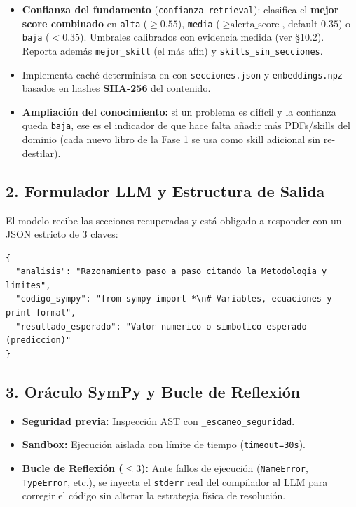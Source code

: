 \documentclass[11pt,a4paper]{article}
\begin{document}
\begin{itemize}[leftmargin=*]
  \item \textbf{Confianza del fundamento} (\texttt{confianza\_retrieval}): clasifica el \textbf{mejor score combinado} en \texttt{alta} ($\ge 0.55$), \texttt{media} ($\ge \text{alerta\_score}$, default $0.35$) o \texttt{baja} ($< 0.35$). Umbrales calibrados con evidencia medida (ver §10.2). Reporta además \texttt{mejor\_skill} (el más afín) y \texttt{skills\_sin\_secciones}.
  \item Implementa caché determinista en  con \texttt{secciones.json} y \texttt{embeddings.npz} basados en hashes \textbf{SHA-256} del contenido.
  \item \textbf{Ampliación del conocimiento:} si un problema es difícil y la confianza queda \texttt{baja}, ese es el indicador de que hace falta añadir más PDFs/skills del dominio (cada nuevo libro de la Fase 1 se usa como skill adicional sin re-destilar).
\end{itemize}

\subsection{2. Formulador LLM y Estructura de Salida}
El modelo recibe las secciones recuperadas y está obligado a responder con un JSON estricto de 3 claves:
\begin{tcolorbox}[cajaContenido, title={\faIcon{code}~Contrato de Datos del Formulador}]
\begin{lstlisting}
{
  "analisis": "Razonamiento paso a paso citando la Metodologia y limites",
  "codigo_sympy": "from sympy import *\n# Variables, ecuaciones y print formal",
  "resultado_esperado": "Valor numerico o simbolico esperado (prediccion)"
}
\end{lstlisting}
\end{tcolorbox}

\subsection{3. Oráculo SymPy y Bucle de Reflexión}
\begin{itemize}[leftmargin=*]
  \item \textbf{Seguridad previa:} Inspección AST con \texttt{\_escaneo\_seguridad}.
  \item \textbf{Sandbox:} Ejecución aislada con límite de tiempo (\texttt{timeout=30s}).
  \item \textbf{Bucle de Reflexión ($\le 3$):} Ante fallos de ejecución (\texttt{NameError}, \texttt{TypeError}, etc.), se inyecta el \texttt{stderr} real del compilador al LLM para corregir el código sin alterar la estrategia física de resolución.
\end{itemize}
\end{document}
